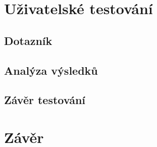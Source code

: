 \chapter{Uživatelské testování}
\section{Dotazník}
\section{Analýza výsledků}
\section{Závěr testování}

\chapter{Závěr}

%
